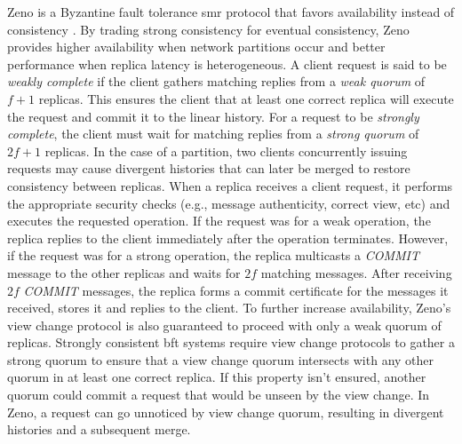 Zeno is a Byzantine fault tolerance \acrshort{smr} protocol that favors availability instead of consistency \cite{Singh2009}. By trading strong consistency for eventual consistency, Zeno provides higher availability when network partitions occur and better performance when replica latency is heterogeneous.  A client request is said to be \textit{weakly complete} if the client gathers matching replies from a \textit{weak quorum} of $f+1$ replicas. This ensures the client that at least one correct replica will execute the request and commit it to the linear history. For a request to be \textit{strongly complete}, the client must wait for matching replies from a \textit{strong quorum} of $2f+1$ replicas. In the case of a partition, two clients concurrently issuing requests may cause divergent histories that can later be merged to restore consistency between replicas. When a replica receives a client request, it performs the appropriate security checks (e.g., message authenticity, correct view, etc) and executes the requested operation. If the request was for a weak operation, the replica replies to the client immediately after the operation terminates. However, if the request was for a strong operation, the replica multicasts a \textit{COMMIT} message to the other replicas and waits for $2f$ matching messages. After receiving $2f$ \textit{COMMIT} messages, the replica forms a commit certificate for the messages it received, stores it and replies to the client. To further increase availability, Zeno's view change protocol is also guaranteed to proceed with only a weak quorum of replicas. Strongly consistent \acrshort{bft} systems require view change protocols to gather a strong quorum to ensure that a view change quorum intersects with any other quorum in at least one correct replica. If this property isn't ensured, another quorum could commit a request that would be unseen by the view change. In Zeno, a request can go unnoticed by view change quorum, resulting in divergent histories and a subsequent merge. \par
